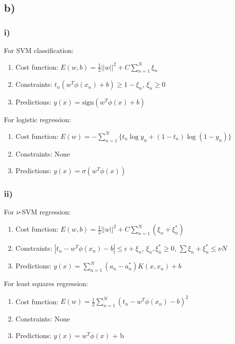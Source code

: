 \documentclass[a4paper,12pt]{article}
\begin{document}
\subsection*{b)}

\subsubsection*{i)}

For SVM classification:
\begin{enumerate}
	\item Cost function: $E(w, b) = \frac{1}{2} ||w||^2 + C \sum_{n=1}^{N} \xi_n$
	\item Constraints: $t_n (w^T \phi(x_n) + b) \geq 1 - \xi_n$, $\xi_n \geq 0$
	\item Predictions: $y(x) = \text{sign}(w^T \phi(x) + b)$
\end{enumerate}

For logistic regression:
\begin{enumerate}
	\item Cost function: $E(w) = - \sum_{n=1}^{N} \{t_n \log y_n + (1 - t_n) \log (1 - y_n)\}$
	\item Constraints: None
	\item Predictions: $y(x) = \sigma(w^T \phi(x))$
\end{enumerate}

\subsubsection*{ii)}

For $\nu$-SVM regression:
\begin{enumerate}
	\item Cost function: $E(w, b) = \frac{1}{2} ||w||^2 + C \sum_{n=1}^{N} (\xi_n + \xi_n^*)$
	\item Constraints: $|t_n - w^T \phi(x_n) - b| \leq \epsilon + \xi_n$, $\xi_n, \xi_n^* \geq 0$, $\sum \xi_n + \xi_n^* \leq \nu N$
	\item Predictions: $y(x) = \sum_{n=1}^{N} (a_n - a_n^*) K(x, x_n) + b$
\end{enumerate}


For least squares regression:
\begin{enumerate}
	\item Cost function: $E(w) = \frac{1}{2} \sum_{n=1}^{N} (t_n - w^T \phi(x_n) - b)^2$
	\item Constraints: None
	\item Predictions: $y(x) = w^T \phi(x)$ + b
\end{enumerate}
\end{document}
